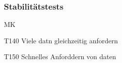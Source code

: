 \subsubsection{Stabilitätstests}
\begin{Kriterien}{MK}

	\item[T140] Viele datn gleichzeitig anfordern

	\item[T150] Schnelles Anforddern von daten
	
\end{Kriterien}
